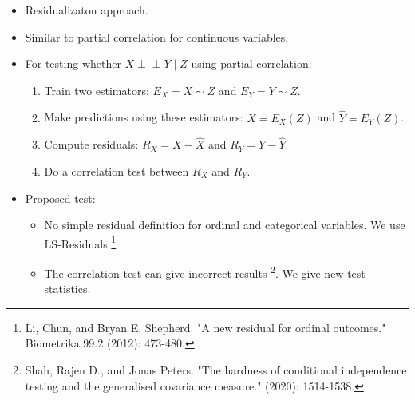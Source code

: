 \documentclass{beamer}
\def\ci{\perp\!\!\!\!\!\perp}
\begin{document}
\begin{frame}
	\frametitle{}
	\begin{itemize}
		\item Residualizaton approach.
		\item Similar to partial correlation for continuous variables.
		\item For testing whether $ X \ci Y \mid Z $ using partial correlation:
			\begin{enumerate}
				\item Train two estimators: $ E_X = X \sim Z $ and $ E_Y = Y \sim Z $.
				\item Make predictions using these estimators: $ \hat{X} = E_X(Z) $ and $ \hat{Y} = E_Y(Z) $.
				\item Compute residuals: $ R_X = X - \hat{X} $ and $ R_Y = Y - \hat{Y} $.
				\item Do a correlation test between $ R_X $ and $ R_Y $.
			\end{enumerate}
		\item Proposed test:
			\begin{itemize}
				\item No simple residual definition for ordinal and categorical variables. We use LS-Residuals \footnote{Li, Chun, and Bryan E. Shepherd. "A new residual for ordinal outcomes." Biometrika 99.2 (2012): 473-480.}
				\item The correlation test can give incorrect results \footnote{Shah, Rajen D., and Jonas Peters. "The hardness of conditional independence testing and the generalised covariance measure." (2020): 1514-1538.}. We give new test statistics.
			\end{itemize}
	\end{itemize}
\end{frame}
\end{document}
